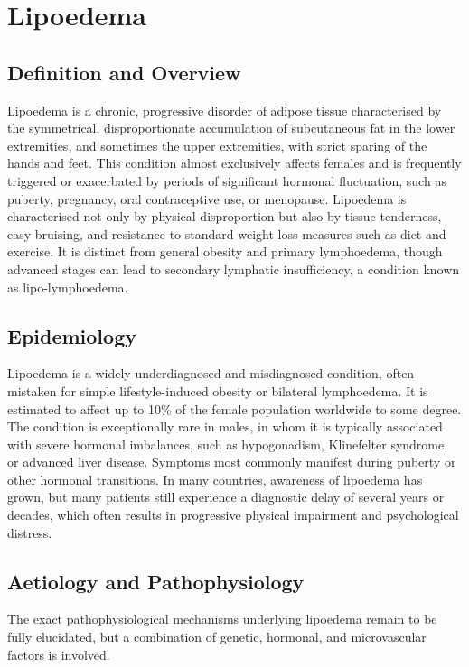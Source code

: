 \chapter{Lipoedema}

\section*{Definition and Overview}
Lipoedema is a chronic, progressive disorder of adipose tissue characterised by the symmetrical, disproportionate accumulation of subcutaneous fat in the lower extremities, and sometimes the upper extremities, with strict sparing of the hands and feet. This condition almost exclusively affects females and is frequently triggered or exacerbated by periods of significant hormonal fluctuation, such as puberty, pregnancy, oral contraceptive use, or menopause. Lipoedema is characterised not only by physical disproportion but also by tissue tenderness, easy bruising, and resistance to standard weight loss measures such as diet and exercise. It is distinct from general obesity and primary lymphoedema, though advanced stages can lead to secondary lymphatic insufficiency, a condition known as lipo-lymphoedema.

\section*{Epidemiology}
Lipoedema is a widely underdiagnosed and misdiagnosed condition, often mistaken for simple lifestyle-induced obesity or bilateral lymphoedema. It is estimated to affect up to 10\% of the female population worldwide to some degree. The condition is exceptionally rare in males, in whom it is typically associated with severe hormonal imbalances, such as hypogonadism, Klinefelter syndrome, or advanced liver disease. Symptoms most commonly manifest during puberty or other hormonal transitions. In many countries, awareness of lipoedema has grown, but many patients still experience a diagnostic delay of several years or decades, which often results in progressive physical impairment and psychological distress.

\section*{Aetiology and Pathophysiology}
The exact pathophysiological mechanisms underlying lipoedema remain to be fully elucidated, but a combination of genetic, hormonal, and microvascular factors is involved.

